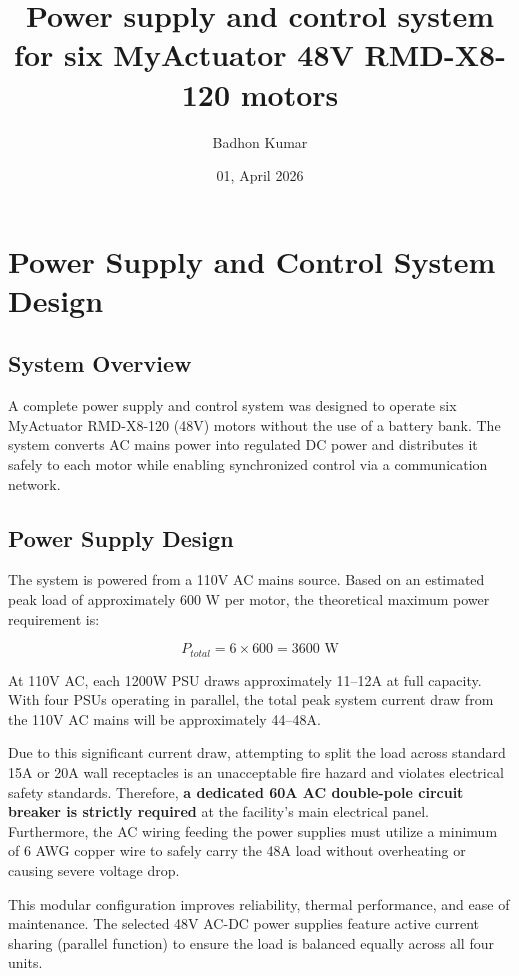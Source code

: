 \documentclass{article}
\title{Power supply and control system for six MyActuator 48V RMD-X8-120 motors}
\author{Badhon Kumar}
\date{01, April 2026}
\begin{document}
\maketitle

\section{Power Supply and Control System Design}

\subsection{System Overview}
A complete power supply and control system was designed to operate six MyActuator RMD-X8-120 (48V) motors without the use of a battery bank. The system converts AC mains power into regulated DC power and distributes it safely to each motor while enabling synchronized control via a communication network.

\subsection{Power Supply Design}
The system is powered from a 110V AC mains source. Based on an estimated peak load of approximately 600 W per motor, the theoretical maximum power requirement is:

\begin{equation}
P_{total} = 6 \times 600 = 3600 \text{ W}
\end{equation}

\noindent
At 110V AC, each 1200W PSU draws approximately 11--12A at full capacity. With four PSUs operating in parallel, the total peak system current draw from the 110V AC mains will be approximately 44--48A.

\noindent
Due to this significant current draw, attempting to split the load across standard 15A or 20A wall receptacles is an unacceptable fire hazard and violates electrical safety standards. Therefore, \textbf{a dedicated 60A AC double-pole circuit breaker is strictly required} at the facility's main electrical panel. Furthermore, the AC wiring feeding the power supplies must utilize a minimum of 6 AWG copper wire to safely carry the 48A load without overheating or causing severe voltage drop.

\noindent
This modular configuration improves reliability, thermal performance, and ease of maintenance. The selected 48V AC-DC power supplies feature active current sharing (parallel function) to ensure the load is balanced equally across all four units.
\end{document}
